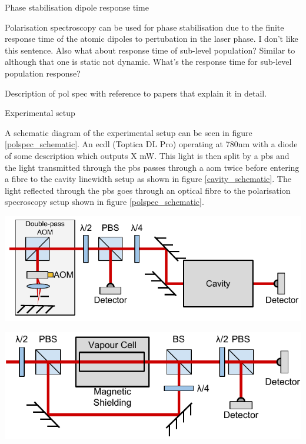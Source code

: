 \documentclass{article}
\newenvironment{Figure}
  {\par\medskip\noindent\minipage{\linewidth}}
  {\endminipage\par\medskip}
\begin{document}
\begin{multicols}{2}
{\color{red}Phase stabilisation dipole response time}

Polarisation spectroscopy can be used for phase stabilisation due to the finite response time of the atomic dipoles to pertubation in the laser phase\cite{torii_laser-phase_2012}. {\color{red} I don't like this sentence. Also what about response time of sub-level population? Similar to \cite{pearman_polarization_2002} although that one is static not dynamic. What's the response time for sub-level population response?}

{\color{red}Description of pol spec with reference to papers that explain it in detail.}

{\color{red}Experimental setup}

A schematic diagram of the experimental setup can be seen in figure \ref{polspec_schematic}. An \gls{ecdl} (Toptica DL Pro) operating at 780nm with {\color{red} a diode of some description} which outputs {\color{red}X} mW. This light is then split by a \gls{pbs} and the light transmitted through the \gls{pbs} passes through a \gls{aom} twice before entering a fibre to the cavity linewidth setup as shown in figure \ref{cavity_schematic}. The light reflected through the \gls{pbs} goes through an optical fibre to the polarisation specroscopy setup shown in figure \ref{polspec_schematic}.

\begin{Figure}
    \centering
    \captionsetup{type=figure}
    \includegraphics[width=\linewidth]{Figs/CavityLinewidth.pdf}
    \label{cavity_schematic}
\end{Figure}

\begin{Figure}
    \centering
    \captionsetup{type=figure}
    \includegraphics[width=\linewidth]{Figs/PolSpec.pdf}
    \label{polspec_schematic}
\end{Figure}


\end{multicols}
\end{document}
